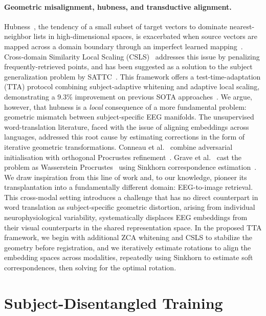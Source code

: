 \documentclass{article}
\begin{document}
\paragraph{Geometric misalignment, hubness, and transductive alignment.}
Hubness~\cite{radovanovic2010hubs}, the tendency of a small subset of target vectors to dominate
nearest-neighbor lists in high-dimensional spaces, is exacerbated when source vectors are mapped
across a domain boundary through an imperfect learned mapping~\cite{dinu2015hubness}.
Cross-domain Similarity Local Scaling (CSLS)~\cite{conneau2018muse} addresses this issue by penalizing frequently-retrieved points, and has been suggested as a solution to the subject generalization problem by SATTC~\cite{huang2026sattc}. This framework offers a test-time-adaptation (TTA) protocol combining subject-adaptive whitening and adaptive local scaling, demonstrating a  9.3\% improvement on previous SOTA approaches~\cite{li2024atm}. We argue, however, that hubness is a \emph{local} consequence of a more fundamental problem: geometric mismatch between subject-specific EEG manifolds.
The unsupervised word-translation literature, faced with the issue of aligning embeddings across languages, addressed this root cause by estimating corrections in the form of iterative geometric transformations.
Conneau et al.~\cite{conneau2018muse} combine adversarial initialisation with orthogonal Procrustes refinement~\cite{schonemann1966procrustes}. Grave et al.~\cite{grave2019wasserstein} cast the problem as Wasserstein
Procrustes~\cite{peyre2019computational} using Sinkhorn correspondence estimation~\cite{cuturi2013sinkhorn}.
We draw inspiration from this line of work and, to our knowledge, pioneer its transplantation into a fundamentally different domain: EEG-to-image retrieval. This cross-modal setting introduces a challenge that has no direct counterpart in word translation as subject-specific geometric distortion, arising from individual neurophysiological variability, systematically displaces EEG embeddings from their visual counterparts in the shared representation space. 
In the proposed TTA framework, we begin with additional ZCA whitening and CSLS to stabilize the geometry before registration, and we iteratively estimate rotations to align the embedding spaces across modalities, repeatedly using Sinkhorn to estimate soft correspondences, then solving for the optimal rotation.



\section{Subject-Disentangled Training}
\label{sec:training}
\end{document}
